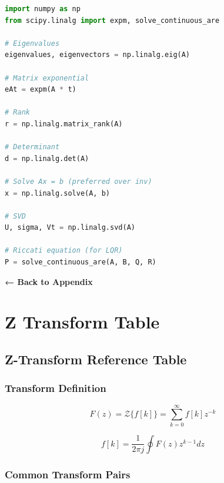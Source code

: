 \documentclass[11pt,a4paper]{book}
\begin{document}
\begin{lstlisting}[language=python]
import numpy as np
from scipy.linalg import expm, solve_continuous_are

# Eigenvalues
eigenvalues, eigenvectors = np.linalg.eig(A)

# Matrix exponential
eAt = expm(A * t)

# Rank
r = np.linalg.matrix_rank(A)

# Determinant
d = np.linalg.det(A)

# Solve Ax = b (preferred over inv)
x = np.linalg.solve(A, b)

# SVD
U, sigma, Vt = np.linalg.svd(A)

# Riccati equation (for LQR)
P = solve_continuous_are(A, B, Q, R)
\end{lstlisting}

\medskip\noindent\hrulefill\medskip

\textbf{← Back to Appendix}


\section{Z Transform Table}
\subsection{Z-Transform Reference Table}

\subsubsection{Transform Definition}

\[F(z) = \mathcal{Z}\{f[k]\} = \sum_{k=0}^{\infty} f[k] z^{-k}\]

\[f[k] = \frac{1}{2\pi j} \oint F(z) z^{k-1} dz\]

\medskip\noindent\hrulefill\medskip

\subsubsection{Common Transform Pairs}
\end{document}
